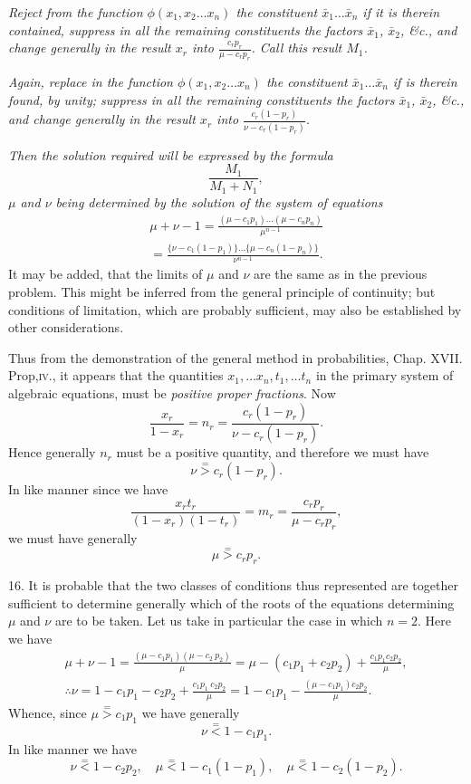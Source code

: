 \documentclass[oneside]{book}
\begin{document}
\textit{Reject from the function $\phi(x_1,x_2\dotsc x_n)$ the constituent $\bar{x}_1 \dotsc \bar{x}_n$ if
it is therein contained, suppress in all the remaining constituents
the factors $\bar{x}_1$, $\bar{x}_2$, \&c., and change generally in the result $x_r$ into
$\frac{c_r p_r}{\mu - c_r p_r}$. Call this result $M_1$.}

\textit{Again, replace in the function $\phi(x_1,x_2\dotsc x_n)$ the constituent
$\bar{x}_1 \dotsc \bar{x}_n$ if is therein found, by unity; suppress in all the remaining
constituents the factors $\bar{x}_1$, $\bar{x}_2$, \&c., and change generally in the result
$x_r$ into $\frac{c_r (1-p_r)}{\nu - c_r (1-p_r)}$.}

\textit{Then the solution required will be expressed by the formula
\[\frac{M_1}{M_1 + N_1},\tag{14}\]
$\mu$ and $\nu$ being determined by the solution of the system of equations
\begin{multline*}
\mu + \nu - 1
= \frac{(\mu - c_1 p_1)\dotsc (\mu - c_n p_n)}{\mu^{n-1}}   \\
= \frac{ \{\nu - c_1 (1 - p_1)\} \dotsc \{\mu - c_n (1 - p_n)\} }
       {\nu^{n-1}}.
\tag{15}
\end{multline*}
}
It may be added, that the limits of $\mu$ and $\nu$ are the same as in
the previous problem. This might be inferred from the general
principle of continuity; but conditions of limitation, which are
probably sufficient, may also be established by other considerations.

Thus from the demonstration of the general method in probabilities, Chap. XVII. Prop,\textsc{iv.}, it appears that the quantities
$x_1, \dotsc x_n, t_1, \dotsc t_n$ in the primary system of algebraic equations,
must be \emph{positive proper fractions}. Now
\[
  \frac{x_r}{1-x_r} = n_r =  \frac{c_r(1-p_r)}{\nu - c_r(1-p_r)}.
\]
Hence generally $n_r$ must be a positive quantity, and therefore
we must have
\[
  \nu \stackrel{=}{>} c_r(1-p_r).
\]
In like manner since we have
\[
  \frac{x_r t_r}{(1-x_r)(1-t_r)}= m_r = \frac{c_r p_r}{\mu - c_r p_r},
\]
we must have generally
\[
  \mu \stackrel{=}{>} c_r p_r.
\]

16. It is probable that the two classes of conditions thus represented are together sufficient to determine generally which of
the roots of the equations determining $\mu$ and $\nu$ are to be taken.
Let us take in particular the case in which $n = 2$. Here we have
\begin{gather*}
  \mu + \nu - 1 = \frac{(\mu - c_1 p_1)(\mu - c_2\ p_2)}{\mu}
= \mu - (c_1 p_1 + c_2 p_2) + \frac{c_1 p_1 c_2 p_2}{\mu},
\\
  \therefore\nu = 1 - c_1 p_1 - c_2 p_2 +\frac{c_1 p_1\ c_2 p_2}{\mu}
= 1 - c_1 p_1 - \frac{(\mu - c_1 p_1) c_2 p_2}{\mu}.
\end{gather*}
Whence, since $\mu \stackrel{=}{>} c_1 p_1$ we have generally
\[
  \nu \stackrel{=}{<} 1 - c_1 p_1.
\]
In like manner we have
\[
  \nu \stackrel{=}{<} 1 - c_2 p_2,\quad
  \mu \stackrel{=}{<} 1 - c_1(1-p_1),\quad
  \mu \stackrel{=}{<} 1 - c_2(1-p_2).
\]
\end{document}
